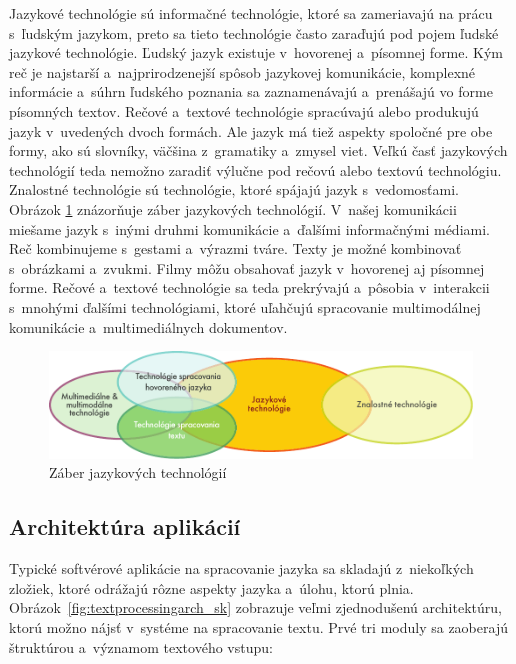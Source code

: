 \clearpage


\begin{multicols}{2}
Jazykové technológie sú informačné technológie, ktoré
sa zameriavajú na prácu s~ľudským jazykom, preto sa tieto
technológie často zaraďujú pod pojem ľudské jazykové
technológie. Ľudský jazyk existuje v~hovorenej a~písomnej forme.
Kým reč je najstarší a~najprirodzenejší spôsob jazykovej
komunikácie, komplexné informácie a~súhrn ľudského poznania sa
zaznamenávajú a~prenášajú vo forme písomných textov. Rečové
a~textové technológie spracúvajú alebo produkujú jazyk v~uvedených
dvoch formách. Ale jazyk má tiež aspekty spoločné pre obe formy,
ako sú slovníky, väčšina z~gramatiky a~zmysel viet. Veľkú časť
jazykových technológií teda nemožno zaradiť výlučne pod rečovú
alebo textovú technológiu. Znalostné technológie sú technológie,
ktoré spájajú jazyk s~vedomosťami. Obrázok \ref{fig:ltincontextsk}
znázorňuje záber jazykových technológií. V~našej komunikácii
miešame jazyk s~inými druhmi komunikácie a~ďalšími informačnými
médiami. Reč kombinujeme s~gestami a~výrazmi tváre. Texty je možné
kombinovať s~obrázkami a~zvukmi. Filmy môžu obsahovať jazyk
v~hovorenej aj písomnej forme. Rečové a~textové technológie sa teda
prekrývajú a~pôsobia v~interakcii s~mnohými ďalšími
technológiami, ktoré uľahčujú spracovanie multimodálnej
komunikácie a~multimediálnych dokumentov.

\begin{figure}[ht]
  \center
  \includegraphics[width=\textwidth]{../_media/slovak/language_technologies}
  \caption{Záber jazykových technológií}
  \label{fig:ltincontextsk}
\end{figure}

\subsection{Architektúra aplikácií}
Typické softvérové aplikácie na spracovanie jazyka sa
skladajú z~niekoľkých zložiek, ktoré odrážajú rôzne aspekty
jazyka a~úlohu, ktorú plnia. Obrázok~\ref{fig:textprocessingarch_sk}
zobrazuje veľmi zjednodušenú architektúru, ktorú možno nájsť
v~systéme na spracovanie textu. Prvé tri moduly sa zaoberajú
štruktúrou a~významom textového vstupu:


\end{multicols}
